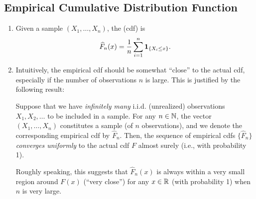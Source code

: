 \subsection{Empirical Cumulative Distribution Function}
\begin{enumerate}
\item Given a sample \((X_1,\dotsc,X_n)\), the  (cdf) is
\[
\widehat{F}_n(x)=\frac{1}{n}\sum_{i=1}^{n}\mathbf{1}_{\left\{X_i\le x\right\}}.
\]

\item Intuitively, the empirical cdf should be somewhat ``close'' to the actual
cdf, especially if the number of observations \(n\) is large. This is justified
by the following result:
\begin{theorem}
\label{thm:gilvenko-cantelli}
Suppose that we have \emph{infinitely many} i.i.d. (unrealized) observations
\(X_1,X_2,\dotsc\) to be included in a sample.  For any \(n\in\mathbb{N}\), the vector
\((X_1,\dotsc,X_n)\) constitutes a sample (of \(n\) observations), and we
denote the corresponding empirical cdf by \(\widehat{F}_n\). Then, the sequence
of empirical cdfs \(\{\widehat{F}_{n}\}\) \emph{converges uniformly} to the
actual cdf \(F\) almost surely (i.e., with probability 1).
\end{theorem}
\begin{note}
Roughly speaking, this suggests that \(\widehat{F}_{n}(x)\) is always within a
very small region around \(F(x)\) (``very close'') for any \(x\in\mathbb{R}\) (with
probability 1) when \(n\) is very large.
\end{note}
\end{enumerate}
